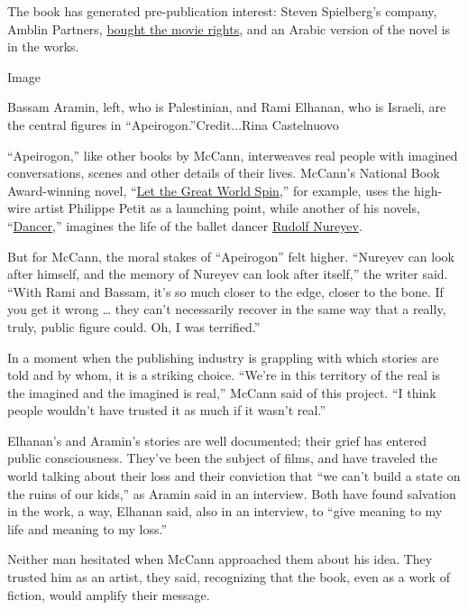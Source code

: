 The book has generated pre-publication interest: Steven Spielberg's
company, Amblin Partners,
\href{https://www.hollywoodreporter.com/news/amblin-nabs-israeli-palestinian-friendship-novel-apeirogon-1278792}{bought
the movie rights}, and an Arabic version of the novel is in the works.

Image

Bassam Aramin, left, who is Palestinian, and Rami Elhanan, who is
Israeli, are the central figures in ``Apeirogon.''Credit...Rina
Castelnuovo

``Apeirogon,'' like other books by McCann, interweaves real people with
imagined conversations, scenes and other details of their lives.
McCann's National Book Award-winning novel,
``\href{https://www.nytimes3xbfgragh.onion/2009/08/02/books/review/Mahler-t.html}{Let
the Great World Spin},'' for example, uses the high-wire artist Philippe
Petit as a launching point, while another of his novels,
``\href{https://www.nytimes3xbfgragh.onion/2003/01/19/books/a-story-with-legs.html}{Dancer},''
imagines the life of the ballet dancer
\href{https://www.nytimes3xbfgragh.onion/1993/01/07/arts/rudolf-nureyev-charismatic-dancer-who-gave-fire-to-ballet-s-image-dies-at-54.html}{Rudolf
Nureyev}.

But for McCann, the moral stakes of ``Apeirogon'' felt higher. ``Nureyev
can look after himself, and the memory of Nureyev can look after
itself,'' the writer said. ``With Rami and Bassam, it's so much closer
to the edge, closer to the bone. If you get it wrong \ldots{} they can't
necessarily recover in the same way that a really, truly, public figure
could. Oh, I was terrified.''

In a moment when the publishing industry is grappling with which stories
are told and by whom, it is a striking choice. ``We're in this territory
of the real is the imagined and the imagined is real,'' McCann said of
this project. ``I think people wouldn't have trusted it as much if it
wasn't real.''

Elhanan's and Aramin's stories are well documented; their grief has
entered public consciousness. They've been the subject of films, and
have traveled the world talking about their loss and their conviction
that ``we can't build a state on the ruins of our kids,'' as Aramin said
in an interview. Both have found salvation in the work, a way, Elhanan
said, also in an interview, to ``give meaning to my life and meaning to
my loss.''

Neither man hesitated when McCann approached them about his idea. They
trusted him as an artist, they said, recognizing that the book, even as
a work of fiction, would amplify their message.

